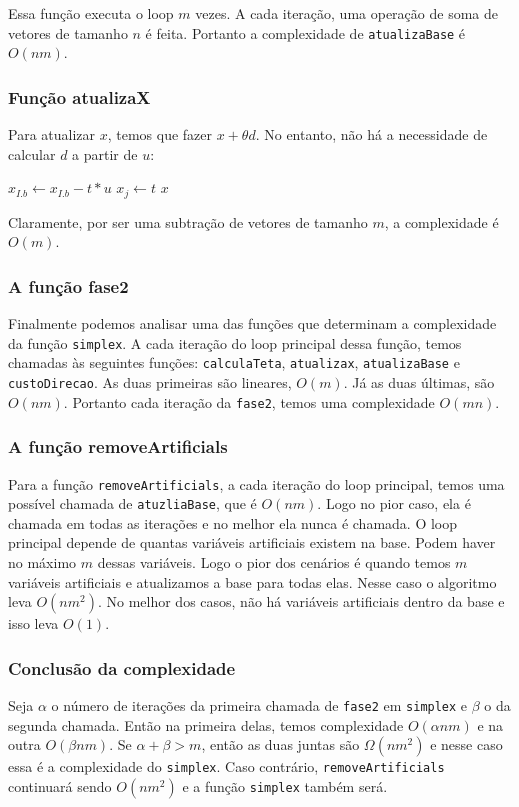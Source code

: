 \documentclass[12pt]{article}
\begin{document}
Essa função executa o loop $m$ vezes. A cada iteração, uma operação de soma de vetores de tamanho $n$ é feita. Portanto a complexidade de \texttt{atualizaBase} é $O(nm)$.

\subsubsection{Função atualizaX}
Para atualizar $x$, temos que fazer $x + \theta d$. No entanto, não há a necessidade de calcular $d$ a partir de $u$:
\begin{algorithmic}
	\State $x_{I.b} \gets x_{I.b} - t * u$
	\State $x_j \gets t$
	\Return $x$
\EndFunction
\end{algorithmic}
Claramente, por ser uma subtração de vetores de tamanho $m$, a complexidade é $O(m)$.

\subsubsection{A função fase2}
Finalmente podemos analisar uma das funções que determinam a complexidade da função \texttt{simplex}. A cada iteração do loop principal dessa função, temos chamadas às seguintes funções: \texttt{calculaTeta}, \texttt{atualizax}, \texttt{atualizaBase} e \texttt{custoDirecao}. As duas primeiras são lineares, $O(m)$. Já as duas últimas, são $O(nm)$. Portanto cada iteração da \texttt{fase2}, temos uma complexidade $O(mn)$.

\subsubsection{A função removeArtificials}
Para a função \texttt{removeArtificials}, a cada iteração do loop principal, temos uma possível chamada de \texttt{atuzliaBase}, que é $O(nm)$. Logo no pior caso, ela é chamada em todas as iterações e no melhor ela nunca é chamada. O loop principal depende de quantas variáveis artificiais existem na base. Podem haver no máximo $m$ dessas variáveis. Logo o pior dos cenários é quando temos $m$ variáveis artificiais e atualizamos a base para todas elas. Nesse caso o algoritmo leva $O(nm^2)$. No melhor dos casos, não há variáveis artificiais dentro da base e isso leva $O(1)$.

\subsubsection{Conclusão da complexidade}
Seja $\alpha$ o número de iterações da primeira chamada de \texttt{fase2} em \texttt{simplex} e $\beta$ o da segunda chamada. Então na primeira delas, temos complexidade $O(\alpha n m)$ e na outra $O(\beta n m)$. Se $\alpha + \beta > m$, então as duas juntas são $\Omega(nm^2)$ e nesse caso essa é a complexidade do \texttt{simplex}. Caso contrário, \texttt{removeArtificials} continuará sendo $O(nm^2)$ e a função \texttt{simplex} também será.
\end{document}
